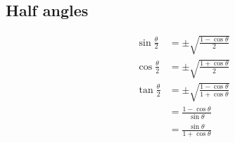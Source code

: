 \subsection*{Half angles}

\begin{align*}
  \sin \frac{\theta}{2}  &= \pm \sqrt{ \frac{1 - \cos \theta }{2} }\\
  \cos \frac{\theta}{2}  &= \pm \sqrt{ \frac{1 + \cos \theta }{2} }\\
  \tan \frac{\theta}{2}  &= \pm \sqrt{ \frac{1 - \cos \theta }{1 + \cos \theta}}\\
    &= \frac{1 - \cos \theta}{\sin \theta}\\
    &= \frac{\sin \theta}{1 + \cos \theta}\\


  
\end{align*}